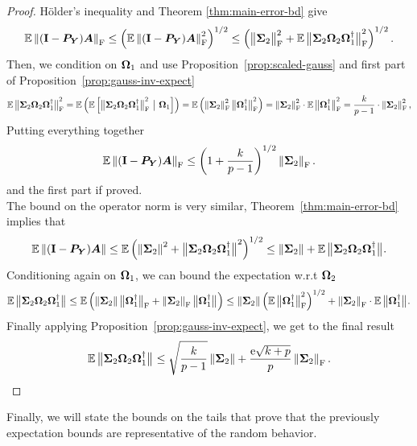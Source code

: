 \begin{proof}
H{\"o}lder's inequality and Theorem \ref{thm:main-error-bd} give 
$$
\Expect \fnorm{ (\Id - \mtx{P}_{\mtx{Y}}) \mtx{A}}
    \leq \left( \Expect \fnormsq{(\Id - \mtx{P}_{\mtx{Y}}) \mtx{A}} \right)^{1/2}
    \leq \left( \smnorm{\rm F}{\mtx{\Sigma}_2}^2 + \Expect \smnorm{\rm F}{ \mtx{\Sigma}_2
                \mtx{\Omega}_2 \mtx{\Omega}_1^\psinv }^2 \right)^{1/2}.
$$
Then, we condition on $\mtx{\Omega}_1$ and use Proposition~\ref{prop:scaled-gauss}
and first part of Proposition~\ref{prop:gauss-inv-expect}
$$
\Expect \smnorm{\rm F}{ \mtx{\Sigma}_2 \mtx{\Omega}_2 \mtx{\Omega}_1^\psinv }^2
    = \Expect \left( \Expect \left[ \smnorm{\rm F}{ \mtx{\Sigma}_2 \mtx{\Omega}_2
\mtx{\Omega}_1^\psinv }^2 \ \big\vert \ \mtx{\Omega}_1 \right] \right)
    = \Expect \left( \fnormsq{\mtx{\Sigma}_2} \smnorm{\rm F}{\mtx{\Omega}_1^\psinv}^2 \right)
    = \fnormsq{\mtx{\Sigma}_2} \cdot \Expect \smnorm{\rm F}{\mtx{\Omega}_1^\psinv}^2
    = \frac{k}{p-1} \cdot \fnormsq{\mtx{\Sigma}_2},
$$
Putting everything together
$$
\Expect \fnorm{ (\Id - \mtx{P}_{\mtx{Y}}) \mtx{A}}
    \leq \left(1 + \frac{k}{p-1}\right)^{1/2} \fnorm{ \mtx{\Sigma}_2 }.
$$
and the first part if proved. \\
The bound on the operator norm is very similar, Theorem~\ref{thm:main-error-bd}
implies that
$$
\Expect \norm{ (\Id - \mtx{P}_{\mtx{Y}}) \mtx{A} }
    \leq \Expect \left( \normsq{\mtx{\Sigma}_2}
        + \smnorm{}{\mtx{\Sigma}_2 \mtx{\Omega}_2 \mtx{\Omega}_1^\psinv }^2 \right)^{1/2}
    \leq \norm{\mtx{\Sigma}_2} + \Expect \smnorm{}{ \mtx{\Sigma}_2 \mtx{\Omega}_2 \mtx{\Omega}_1^\psinv }.
$$
Conditioning again on $\mtx{\Omega}_1$, we can bound the expectation w.r.t
 $\mtx{\Omega}_2$
$$
\Expect \smnorm{}{ \mtx{\Sigma}_2 \mtx{\Omega}_2
\mtx{\Omega}_1^\psinv }
    \leq \Expect \left( \norm{\mtx{\Sigma}_2} \smnorm{\rm F}{\mtx{\Omega}_1^\psinv}
        + \fnorm{\mtx{\Sigma}_2} \smnorm{}{\mtx{\Omega}_1^\psinv} \right)
    \leq \norm{\mtx{\Sigma}_2} \left( \Expect \smnorm{\rm F}{\mtx{\Omega}_1^\psinv}^2 \right)^{1/2}
        + \fnorm{\mtx{\Sigma}_2} \cdot \Expect \smnorm{}{\mtx{\Omega}_1^\psinv}.
$$
Finally applying Proposition~\ref{prop:gauss-inv-expect}, we get to the final
result
$$
\Expect \smnorm{}{ \mtx{\Sigma}_2 \mtx{\Omega}_2
\mtx{\Omega}_1^\psinv }
    \leq \sqrt{\frac{k}{p-1}} \norm{\mtx{\Sigma}_2}
    + \frac{\econst\sqrt{k+p}}{p} \fnorm{\mtx{\Sigma}_2}.
$$
\end{proof}

Finally, we will state the bounds on the tails that prove that the 
previously expectation bounds are representative of the random behavior.

